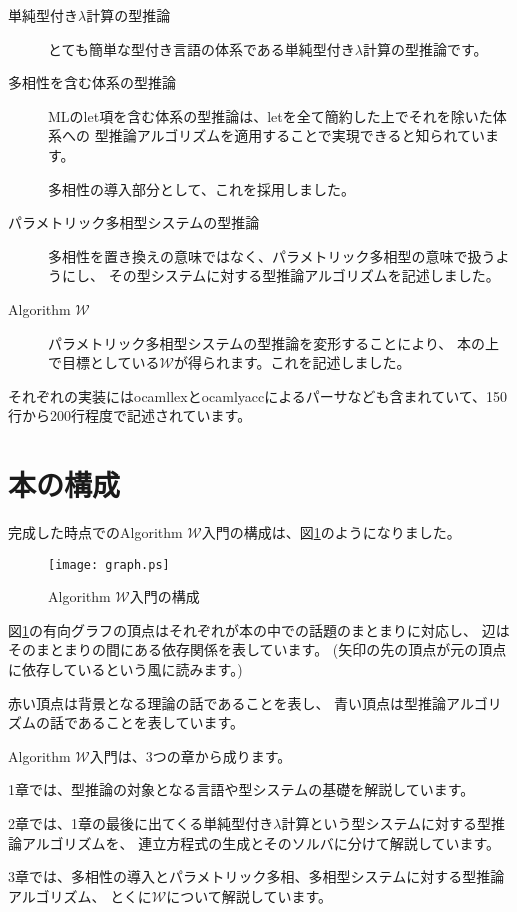 \documentclass[a4paper]{jsarticle}
\begin{document}
\begin{description}
  \item[単純型付き$\lambda$計算の型推論]
    とても簡単な型付き言語の体系である単純型付き$\lambda$計算の型推論です。
  \item[多相性を含む体系の型推論]
    MLのlet項を含む体系の型推論は、letを全て簡約した上でそれを除いた体系への
    型推論アルゴリズムを適用することで実現できると知られています。

    多相性の導入部分として、これを採用しました。
  \item[パラメトリック多相型システムの型推論]
    多相性を置き換えの意味ではなく、パラメトリック多相型の意味で扱うようにし、
    その型システムに対する型推論アルゴリズムを記述しました。
  \item[Algorithm $\mathcal W$]
    パラメトリック多相型システムの型推論を変形することにより、
    本の上で目標としている$\mathcal W$が得られます。これを記述しました。
\end{description}

それぞれの実装にはocamllexとocamlyaccによるパーサなども含まれていて、150行から200行程度で記述されています。

\section{本の構成}

完成した時点でのAlgorithm $\mathcal W$入門の構成は、図\ref{fig:book_graph}のようになりました。

\begin{figure}[htbp]
\begin{center}
\texttt{[image: graph.ps]}
\end{center}
\label{fig:book_graph}
\caption{Algorithm $\mathcal W$入門の構成}
\end{figure}

図\ref{fig:book_graph}の有向グラフの頂点はそれぞれが本の中での話題のまとまりに対応し、
辺はそのまとまりの間にある依存関係を表しています。
(矢印の先の頂点が元の頂点に依存しているという風に読みます。)

赤い頂点は背景となる理論の話であることを表し、
青い頂点は型推論アルゴリズムの話であることを表しています。

Algorithm $\mathcal W$入門は、3つの章から成ります。

1章では、型推論の対象となる言語や型システムの基礎を解説しています。

2章では、1章の最後に出てくる単純型付き$\lambda$計算という型システムに対する型推論アルゴリズムを、
連立方程式の生成とそのソルバに分けて解説しています。

3章では、多相性の導入とパラメトリック多相、多相型システムに対する型推論アルゴリズム、
とくに$\mathcal W$について解説しています。


\nocite{*}

\end{document}
